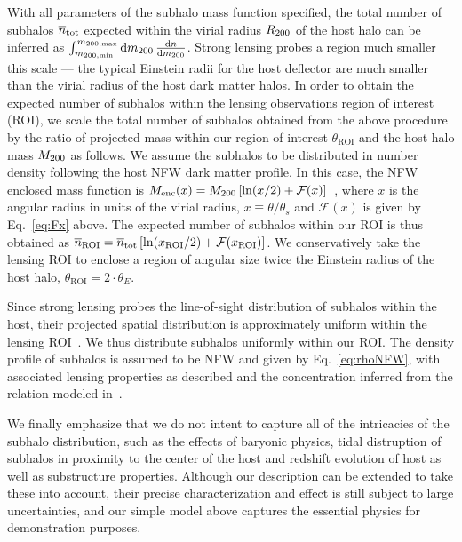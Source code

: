 \documentclass[twocolumn]{aastex62}
\begin{document}
With all parameters of the subhalo mass function specified, the total number of subhalos $\mean{n}_{\mathrm{tot}}$ expected within the virial radius $R_{200}$ of the host halo can be inferred as $\int_{m_\mathrm{200, min}}^{m_\mathrm{200, max}}\mathrm{d} m_{200}\,\frac{\mathrm{d} n}{\mathrm{d} m_{200}}$. Strong lensing probes a region much smaller this scale --- the typical Einstein radii for the host deflector are much smaller than the virial radius of the host dark matter halos. In order to obtain the expected number of subhalos within the lensing observations region of interest (ROI), we scale the total number of subhalos obtained from the above procedure by the ratio of projected mass within our region of interest $\theta_\textrm{ROI}$ and the host halo mass $M_{200}$ as follows. We assume the subhalos to be distributed in number density following the host NFW dark matter profile. In this case, the NFW enclosed mass function is $M_\mathrm{enc}(x) = M_{200}\left[\ln(x/2) + \mathcal{F}(x)\right]$~\citep{2001astro.ph..2341K}, where $x$ is the angular radius in units of the virial radius, $x\equiv \theta/\theta_s$ and $\mathcal{F}(x)$ is given by Eq.~\ref{eq:Fx} above. The expected number of subhalos within our ROI is thus obtained as $\mean n_\mathrm{ROI} = \mean n_\mathrm{tot}\left[\ln(x_\mathrm{ROI}/2) + \mathcal{F}(x_\mathrm{ROI})\right]$. We conservatively take the lensing ROI to enclose a region of angular size twice the Einstein radius of the host halo, $\theta_\mathrm{ROI} = 2\cdot\theta_E$.

Since strong lensing probes the line-of-sight distribution of subhalos within the host, their projected spatial distribution is approximately uniform within the lensing ROI~\citep{2017MNRAS.469.1997D}. We thus distribute subhalos uniformly within our ROI. The density profile of subhalos is assumed to be NFW and given by Eq.~\ref{eq:rhoNFW}, with associated lensing properties as described and the concentration inferred from the relation modeled in~\citet{2014MNRAS.442.2271S}.

We finally emphasize that we do not intent to capture all of the intricacies of the subhalo distribution, such as the effects of baryonic physics, tidal distruption of subhalos in proximity to the center of the host and redshift evolution of host as well as substructure properties. Although our description can be extended to take these into account, their precise characterization and effect is still subject to large uncertainties, and our simple model above captures the essential physics for demonstration purposes.
\end{document}
